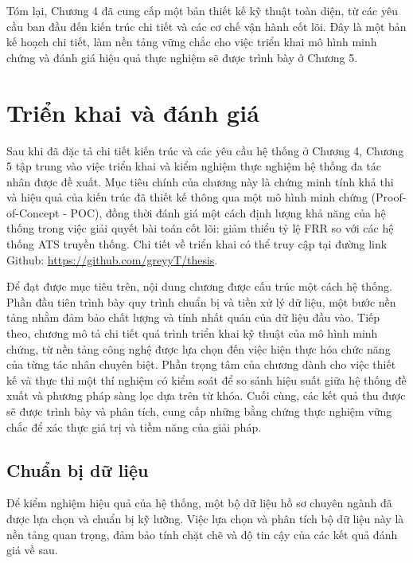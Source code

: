 \documentclass{article}
\newcommand{\nocontentsline}[3]{}
\newcommand{\tocless}[2]{\bgroup\let\addcontentsline=\nocontentsline#1{#2}\egroup}
\begin{document}
\begin{itemize}[topsep=0pt, itemsep=4pt, leftmargin=40pt]
Tóm lại, Chương 4 đã cung cấp một bản thiết kế kỹ thuật toàn diện, từ các yêu cầu ban đầu đến kiến trúc chi tiết và các cơ chế vận hành cốt lõi. Đây là một bản kế hoạch chi tiết, làm nền tảng vững chắc cho việc triển khai mô hình minh chứng và đánh giá hiệu quả thực nghiệm sẽ được trình bày ở Chương 5.

\newpage
\tocless\section{Triển khai và đánh giá}
\addcontentsline{toc}{section}{\numberline{}CHƯƠNG 5: TRIỂN KHAI VÀ ĐÁNH GIÁ}
\setcounter{section}{5}
Sau khi đã đặc tả chi tiết kiến trúc và các yêu cầu hệ thống ở Chương 4, Chương 5 tập trung vào việc triển khai và kiểm nghiệm thực nghiệm hệ thống đa tác nhân được đề xuất. Mục tiêu chính của chương này là chứng minh tính khả thi và hiệu quả của kiến trúc đã thiết kế thông qua một mô hình minh chứng (Proof-of-Concept - POC), đồng thời đánh giá một cách định lượng khả năng của hệ thống trong việc giải quyết bài toán cốt lõi: giảm thiểu tỷ lệ FRR so với các hệ thống ATS truyền thống. Chi tiết về triển khai có thể truy cập tại đường link Github: \href{https://github.com/greyyT/thesis}{https://github.com/greyyT/thesis}.

Để đạt được mục tiêu trên, nội dung chương được cấu trúc một cách hệ thống. Phần đầu tiên trình bày quy trình chuẩn bị và tiền xử lý dữ liệu, một bước nền tảng nhằm đảm bảo chất lượng và tính nhất quán của dữ liệu đầu vào. Tiếp theo, chương mô tả chi tiết quá trình triển khai kỹ thuật của mô hình minh chứng, từ nền tảng công nghệ được lựa chọn đến việc hiện thực hóa chức năng của từng tác nhân chuyên biệt. Phần trọng tâm của chương dành cho việc thiết kế và thực thi một thí nghiệm có kiểm soát để so sánh hiệu suất giữa hệ thống đề xuất và phương pháp sàng lọc dựa trên từ khóa. Cuối cùng, các kết quả thu được sẽ được trình bày và phân tích, cung cấp những bằng chứng thực nghiệm vững chắc để xác thực giá trị và tiềm năng của giải pháp.

\vspace{14pt}
\setcounter{subsection}{0}
\setcounter{table}{0}
\setcounter{figure}{0}
\subsection{Chuẩn bị dữ liệu}
Để kiểm nghiệm hiệu quả của hệ thống, một bộ dữ liệu hồ sơ chuyên ngành đã được lựa chọn và chuẩn bị kỹ lưỡng. Việc lựa chọn và phân tích bộ dữ liệu này là nền tảng quan trọng, đảm bảo tính chặt chẽ và độ tin cậy của các kết quả đánh giá về sau.


\end{itemize}
\end{document}
